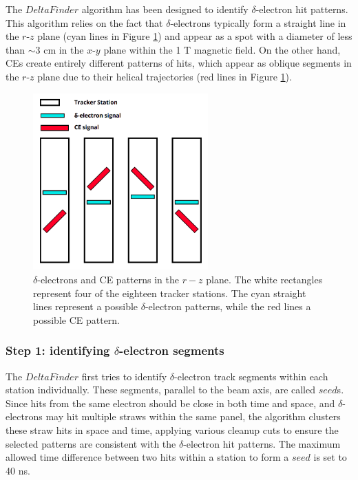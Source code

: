 The $DeltaFinder$ algorithm has been designed 
to identify $\delta$-electron hit patterns. This 
algorithm relies on the 
fact that $\delta$-electrons typically 
form a straight line in 
the $r$-$z$ plane (cyan lines in Figure 
\ref{fig:yzviewdelta}) 
and appear as a spot with a diameter 
of less than $\sim$3 cm in the 
$x$-$y$ plane within the 1 T  
magnetic field. On the other hand, 
CEs create entirely different 
patterns of hits, which appear as oblique segments in 
the $r$-$z$ plane due to their 
helical trajectories (red lines 
in Figure \ref{fig:yzviewdelta}). 
\begin{figure}[!h]
    \centering
    \includegraphics[width =0.6\textwidth]{figures/png/Screenshot_20240811_123048.png}
    \caption[$\delta$-electrons and CE patterns in $r-z$ plane.]{
        $\delta$-electrons and CE patterns in the $r-z$ plane. 
        The white rectangles represent four of the eighteen tracker stations. 
        The cyan straight lines represent a possible $\delta$-electron 
        patterns, while the red lines a possible CE pattern.
        }
    \label{fig:yzviewdelta}
\end{figure}
\subsubsection{Step 1: identifying $\delta$-electron segments}
The $DeltaFinder$ first tries to 
identify $\delta$-electron track 
segments within each station 
individually. These segments, 
parallel to the beam axis, are 
called $seed$s. Since hits 
from the same electron should be 
close in both time and space, 
and $\delta$-electrons may hit 
multiple straws within the 
same panel, the algorithm clusters 
these straw hits in space and time, applying various 
cleanup cuts to ensure the 
selected patterns are consistent with the 
$\delta$-electron hit patterns. 
The maximum allowed time 
difference between two hits within 
a station to form a $seed$ is set to 40 ns.

